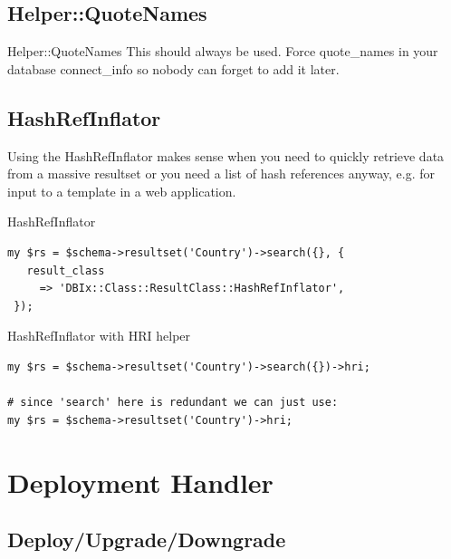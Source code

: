 \subsection{Helper::QuoteNames}

\begin{frame}{Helper::QuoteNames}
This should always be used. Force quote\_names in your database
connect\_info so nobody can forget to add it later.
\end{frame}

\subsection{HashRefInflator}

Using the HashRefInflator makes sense when you need to quickly retrieve
data from a massive resultset or you need a list of hash references anyway,
e.g. for input to a template in a web application.

\begin{frame}[fragile]{HashRefInflator}
\begin{lstlisting}
my $rs = $schema->resultset('Country')->search({}, {
   result_class
     => 'DBIx::Class::ResultClass::HashRefInflator',
 });
\end{lstlisting}
\end{frame}

\begin{frame}[fragile]{HashRefInflator with HRI helper}
\begin{lstlisting}
my $rs = $schema->resultset('Country')->search({})->hri;

# since 'search' here is redundant we can just use:
my $rs = $schema->resultset('Country')->hri;
\end{lstlisting}
\end{frame}


\section{Deployment Handler}

\subsection{Deploy/Upgrade/Downgrade}

